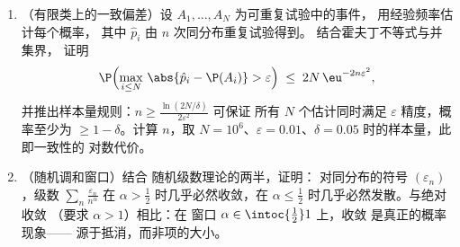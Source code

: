 \begin{problem}
\begin{enumerate}[resume]
  \item （有限类上的一致偏差）设 $A_1,
        \dots, A_N$ 为可重复试验中的事件，
        用经验频率估计每个概率，
        其中 $\hat p_i$ 由 $n$ 次同分布重复试验得到。
        结合霍夫丁不等式与并集界，
        证明
        \[
        \P\Bigl(\max_{i\leq N}\,\abs{\hat p_i - \P(A_i)} >
        \varepsilon\Bigr) \;\leq\; 2N\,\eu^{-2n\varepsilon^2},
        \]
        并推出样本量规则：$n \geq
        \frac{\ln(2N/\delta)}{2\varepsilon^2}$ 可保证
        所有 $N$ 个估计同时满足
        $\varepsilon$ 精度，概率至少为 $\geq 1 -
        \delta$。计算 $n$，取 $N = 10^6$、$\varepsilon =
        0.01$、$\delta = 0.05$ 时的样本量，此即一致性的
        对数代价。
  \item （随机调和窗口）结合
        随机级数理论的两半，证明：
        对同分布的符号 $(\varepsilon_n)$，级数
        $\sum_n\frac{\varepsilon_n}{n^\alpha}$ 在
        $\alpha > \frac12$ 时几乎必然收敛，在
        $\alpha \leq \frac12$ 时几乎必然发散。与绝对收敛
        （要求 $\alpha > 1$）相比：在
        窗口 $\alpha \in \intoc{\frac12}1$ 上，收敛
        是真正的概率现象——
        源于抵消，而非项的大小。
\end{enumerate}
\end{problem}
